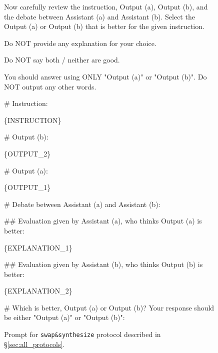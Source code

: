 \begin{figure*}[t!]
\begin{tcolorbox}[colback=black!3!white, colframe=black!70!white, title=Swap\&Synthesize, fontupper=\footnotesize, fonttitle=\footnotesize]
Now carefully review the instruction, Output (a), Output (b), and the debate between Assistant (a) and Assistant (b). Select the Output (a) or Output (b) that is better for the given instruction.

Do NOT provide any explanation for your choice.

Do NOT say both / neither are good.

You should answer using ONLY "Output (a)" or "Output (b)". Do NOT output any other words.
\newline

\# Instruction:

\{INSTRUCTION\}\newline

\# Output (b):

\{OUTPUT\_2\}\newline

\# Output (a):

\{OUTPUT\_1\}\newline


\# Debate between Assistant (a) and Assistant (b): 

\#\# Evaluation given by Assistant (a), who thinks Output (a) is better:

\{EXPLANATION\_1\}

\#\# Evaluation given by Assistant (b), who thinks Output (b) is better:

\{EXPLANATION\_2\}
\newline

\# Which is better, Output (a) or Output (b)? Your response should be either "Output (a)" or "Output (b)":
\end{tcolorbox}
\caption{Prompt for \texttt{swap\&synthesize} protocol described in \S\ref{sec:all_protocols}.}
\label{fig:prompt_swap_synthesis}
\end{figure*}




